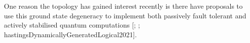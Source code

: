 One reason the topology has gained interest recently is there have
proposals to use this ground state degeneracy to implement both
passively fault tolerant and actively stabilised quantum computations
{[}\textcite{kitaevFaulttolerantQuantumComputation2003};
\textcite{poulinStabilizerFormalismOperator2005};
hastingsDynamicallyGeneratedLogical2021{]}.
